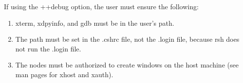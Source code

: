 If using the {\fexec ++debug} option, the user must ensure the
following:
\begin{enumerate}

\item {\fexec xterm}, {\fexec xdpyinfo},  and {\fexec gdb} must be in
the user's path.

\item The path must be set in the {\fexec .cshrc} file, not the {\fexec .login}
file, because {\fexec rsh} does not run the {\fexec .login} file. 

\item The nodes must be authorized to create windows on the host machine (see
man pages for {\fexec xhost} and {\fexec xauth}).

\end{enumerate}

